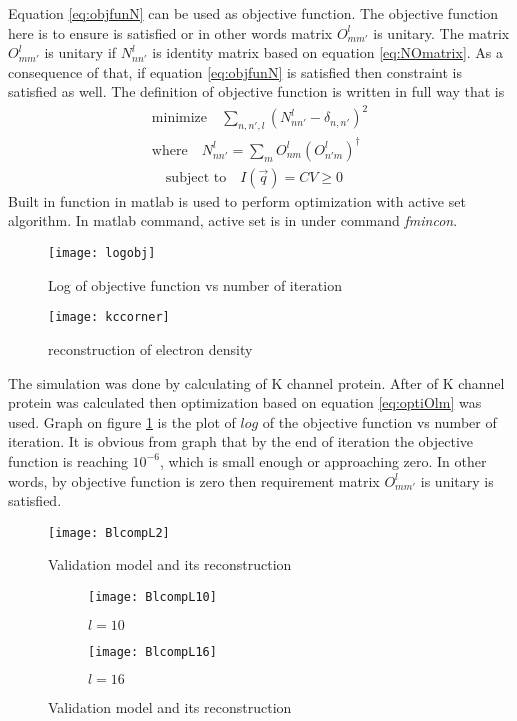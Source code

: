 Equation \ref{eq:objfunN} can be used as objective function. The objective function here is to ensure \Blq is satisfied or in other words matrix $O^{l}_{mm'}$ is unitary. The matrix $O^{l}_{mm'}$ is unitary if $N^{l}_{nn'}$ is identity matrix based on equation \ref{eq:NOmatrix}. As a consequence of that, if equation \ref{eq:objfunN} is satisfied then \Blq constraint is satisfied as well. 
The definition of objective function is written in full way that is
\begin{eqnarray}
\mbox{minimize}\quad \sum_{n,n',l}(N^{l}_{nn'}-\delta_{n,n'})^2 \\
\mbox{where} \quad N^{l}_{nn'}=\sum_{m} O^{l}_{nm}(O^{l}_{n'm})^{\dagger} \\
\quad \mbox{subject to} \quad  I(\vec{q})=C V \geq 0
\label{eq:optiOlm}
\end{eqnarray}
Built in function in matlab is used to perform optimization with active set algorithm. In matlab command, active set is in under command \textit{fmincon}.  
\begin{figure}[h!]
  \centering
  \texttt{[image: logobj]}
\caption{Log of objective function vs number of iteration}
\label{fig:objfun}
\end{figure}
\begin{figure}[h!]
  \centering
  \texttt{[image: kccorner]}
\caption{reconstruction of electron density}
\label{fig:receden}
\end{figure}

The simulation was done by calculating \Blq of K channel protein. After \Blq of K channel protein was calculated then optimization based on equation \ref{eq:optiOlm} was used.  Graph on figure \ref{fig:objfun} is the plot of $log$ of the objective function vs number of iteration. It is obvious from graph that by the end of iteration the objective function is reaching $10^{-6}$, which is small enough or approaching zero. In other words, by objective function is zero then requirement matrix $O^{l}_{mm'}$ is unitary is satisfied.  
\begin{figure}[h!]
  \centering
  \texttt{[image: BlcompL2]}
\caption{Validation model and its reconstruction}
\label{fig:valmodrec2}
\end{figure}
\begin{figure}[h!]
\begin{subfigure}{.5\textwidth}
  \centering
  \texttt{[image: BlcompL10]}
  \caption{$l=10$}
\end{subfigure}
\begin{subfigure}{.5\textwidth}
  \centering
  \texttt{[image: BlcompL16]}
  \caption{$l=16$}
\end{subfigure}
\caption{Validation model and its reconstruction}
\label{fig:valrec1016}
\end{figure}


